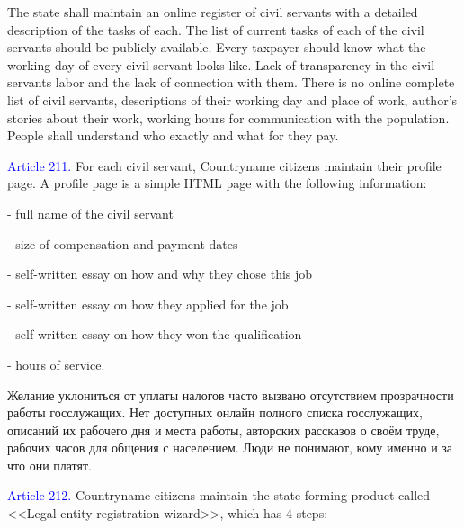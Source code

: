\documentclass[11pt]{article}
\theoremstyle{remark}
\theoremstyle{definition}
\begin{document}
\color{blue}


The state shall maintain an online register of civil servants with a detailed description of the tasks of each. The list of current tasks of each of the civil servants should be publicly available. Every taxpayer should know what the working day of every civil servant looks like. Lack of transparency in the civil servants labor and the lack of connection with them. There is no online complete list of civil servants, descriptions of their working day and place of work, author's stories about their work, working hours for communication with the population. People shall understand who exactly and what for they pay.


\color{black}


\textcolor{blue}{Article 211.} For each civil servant, Countryname citizens maintain their profile page. A profile page is a simple HTML page with the following information:

- full name of the civil servant

- size of compensation and payment dates

- self-written essay on how and why they chose this job

- self-written essay on how they applied for the job

- self-written essay on how they won the qualification

- hours of service.

\color{blue}



Желание уклониться от уплаты налогов часто вызвано отсутствием прозрачности работы госслужащих. Нет доступных онлайн полного списка госслужащих, описаний их рабочего дня и места работы, авторских рассказов о своём труде, рабочих часов для общения с населением. Люди не понимают, кому именно и за что они платят. %



\color{black}


\textcolor{blue}{Article 212.} Countryname citizens maintain the state-forming product called <<Legal entity registration wizard>>, which has 4 steps:
\end{document}
